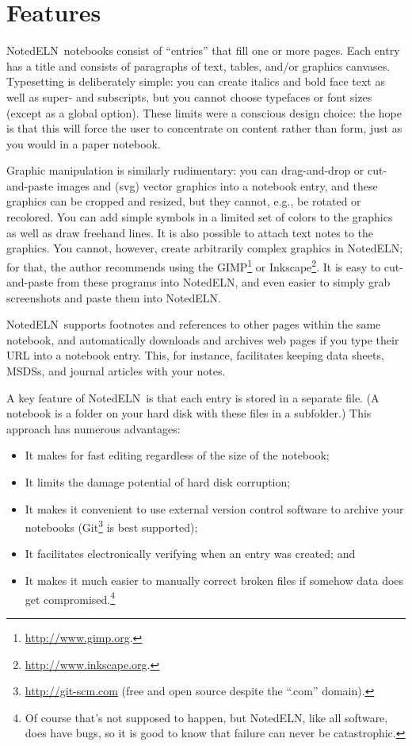\documentclass[11pt]{report}
\newcommand{\NotedELN}{NotedELN} %
\begin{document}
\section{Features}

\NotedELN\ notebooks consist of ``entries'' that fill one or more pages.
Each entry has a title and consists of paragraphs of text, tables, and/or
graphics canvases. Typesetting is deliberately simple: you can create italics
and bold face text as well as super- and subscripts, but you cannot
choose typefaces or font sizes (except as a global option). These
limits were a conscious design choice: the hope is that this will
force the user to concentrate on content rather than form, just as you
would in a paper notebook.

Graphic manipulation is similarly rudimentary: you can drag-and-drop
or cut-and-paste images and (svg) vector graphics into a notebook
entry, and these graphics can be cropped and resized, but they cannot,
e.g., be rotated or recolored. You can add simple symbols in a limited
set of colors to the graphics as well as draw freehand lines. It is also
possible to attach text notes to the graphics. You cannot, however,
create arbitrarily complex graphics in \NotedELN; for that, the author
recommends using the GIMP\footnote{\url{http://www.gimp.org}.} or
Inkscape\footnote{\url{http://www.inkscape.org}.}. It is easy to
cut-and-paste from these programs into \NotedELN, and even easier to simply
grab screenshots and paste them into \NotedELN.

\NotedELN\ supports footnotes and references to other pages within the same
notebook, and automatically downloads and archives web pages if you
type their URL into a notebook entry. This, for instance, facilitates
keeping data sheets, MSDSs, and journal articles with your notes.

A key feature of \NotedELN\ is that each entry is stored in a separate
file. (A notebook is a folder on your hard disk with these files in a
subfolder.) This approach has numerous advantages:
\begin{itemize}
  \item It makes for fast
editing regardless of the size of the notebook;
\item It limits the damage
potential of hard disk corruption;
\item It makes it convenient to use external version control software
  to archive your notebooks (Git\footnote{\url{http://git-scm.com} (free and
    open source despite the ``.com'' domain).} is best
  supported);
\item It facilitates electronically verifying when an
entry was created; and
\item It makes it much easier to manually correct
broken files if somehow data does get compromised.\footnote{Of course
  that's not supposed to happen, but \NotedELN, like all software, does have
  bugs, so it is good to know that failure can never be catastrophic.}
\end{itemize}
\end{document}
